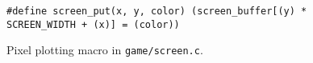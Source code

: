 \begin{figure}[ht]
\centering
\lstset{language=C,basicstyle=\ttfamily,numbers=left,firstnumber=74,breaklines=true}
\begin{lstlisting}
#define screen_put(x, y, color) (screen_buffer[(y) * SCREEN_WIDTH + (x)] = (color))
\end{lstlisting}
\caption{Pixel plotting macro in \texttt{game/screen.c}.}
\label{lst:screen_put}
\end{figure}
